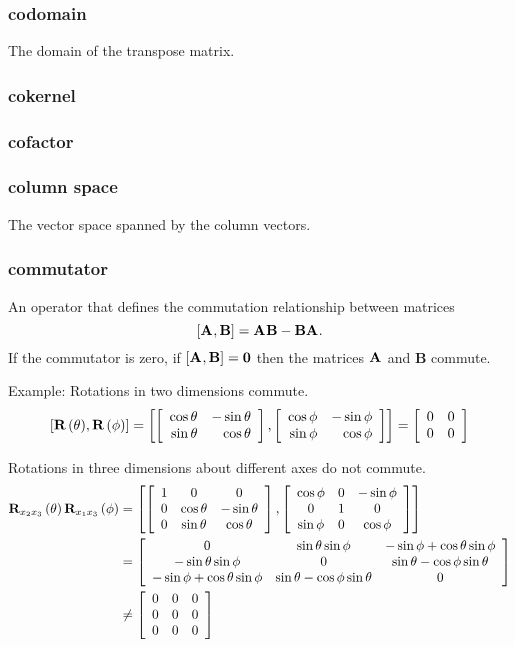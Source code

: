 \subsubsection*{codomain}
The domain of the transpose matrix.

\subsubsection*{cokernel}

\subsubsection*{cofactor}

\subsubsection*{column space}
The vector space spanned by the column vectors.

\subsubsection*{commutator}
An operator that defines the commutation relationship between matrices
$$
 \left[ \A{}, \textbf{B} \right] = \A{}\textbf{B}-\textbf{B}\A{}.
$$
If the commutator is zero, if $\left[ \A{}, \textbf{B} \right] = \zero$ then the matrices $\A{}$ and $\textbf{B}$ commute.

Example: Rotations in two dimensions commute.
\begin{equation}
  \brac{\rot, \textbf{R}\paren{\phi}} = \brac{
  \mat{rr}{ \cos \theta&-\sin \theta \\ \sin \theta&\cos \theta },\mat{rr}{ \cos \phi&-\sin \phi \\ \sin \phi&\cos \phi}} = \mat{rr}{ 0&0\\0&0}
\end{equation}

Rotations in three dimensions about different axes do not commute. 
\begin{equation}
  \begin{split}
    \textbf{R}_{x_2 x_3}\paren{\theta} \textbf{R}_{x_1 x_3}\paren{\phi} &= 
    \brac{
\mat{ccc}{
 1 & 0 & 0 \\
 0 & \cos\theta & -\sin\theta \\
 0 & \sin\theta & \cos\theta
}
,
\mat{ccc}{
 \cos \phi & 0 & -\sin \phi \\
 0 & 1 & 0 \\
 \sin \phi & 0 & \cos \phi
}
} \\
  & =
  \mat{ccc}{
   0 & \sin\theta \sin \phi & -\sin \phi+\cos\theta \sin \phi \\
  -\sin\theta \sin \phi & 0 & \sin\theta-\cos \phi \sin\theta \\
  -\sin\phi+\cos\theta \sin \phi & \sin\theta-\cos \phi \sin\theta & 0
  } \\
  & \ne
  \mat{ccc}{
   0 & 0 & 0 \\
   0 & 0 & 0 \\
   0 & 0 & 0
  }
  \end{split}
\end{equation}

